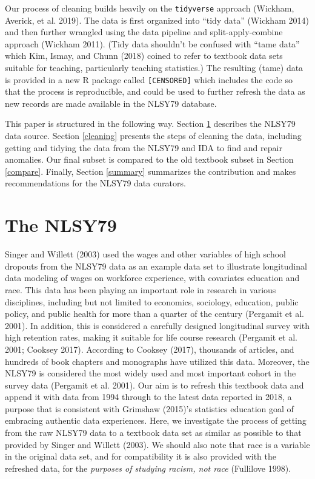 \documentclass{article}
\begin{document}
Our process of cleaning builds heavily on the \texttt{tidyverse} approach (Wickham, Averick, et al. 2019). The data is first organized into ``tidy data'' (Wickham 2014) and then further wrangled using the data pipeline and split-apply-combine approach (Wickham 2011). (Tidy data shouldn't be confused with ``tame data'' which Kim, Ismay, and Chunn (2018) coined to refer to textbook data sets suitable for teaching, particularly teaching statistics.) The resulting (tame) data is provided in a new R package called \texttt{[CENSORED]} which includes the code so that the process is reproducible, and could be used to further refresh the data as new records are made available in the NLSY79 database.

This paper is structured in the following way. Section \ref{database} describes the NLSY79 data source. Section \ref{cleaning} presents the steps of cleaning the data, including getting and tidying the data from the NLSY79 and IDA to find and repair anomalies. Our final subset is compared to the old textbook subset in Section \ref{compare}. Finally, Section \ref{summary} summarizes the contribution and makes recommendations for the NLSY79 data curators.

\hypertarget{database}{%
\section{The NLSY79}\label{database}}

Singer and Willett (2003) used the wages and other variables of high school dropouts from the NLSY79 data as an example data set to illustrate longitudinal data modeling of wages on workforce experience, with covariates education and race. This data has been playing an important role in research in various disciplines, including but not limited to economics, sociology, education, public policy, and public health for more than a quarter of the century (Pergamit et al. 2001). In addition, this is considered a carefully designed longitudinal survey with high retention rates, making it suitable for life course research (Pergamit et al. 2001; Cooksey 2017). According to Cooksey (2017), thousands of articles, and hundreds of book chapters and monographs have utilized this data. Moreover, the NLSY79 is considered the most widely used and most important cohort in the survey data (Pergamit et al. 2001).
Our aim is to refresh this textbook data and append it with data from 1994 through to the latest data reported in 2018, a purpose that is consistent with Grimshaw (2015)'s statistics education goal of embracing authentic data experiences. Here, we investigate the process of getting from the raw NLSY79 data to a textbook data set as similar as possible to that provided by Singer and Willett (2003). We should also note that race is a variable in the original data set, and for compatibility it is also provided with the refreshed data, for the \emph{purposes of studying racism, not race} (Fullilove 1998).
\end{document}
